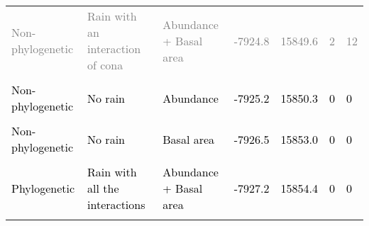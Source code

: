 \documentclass[
  12pt,
  letterpaper,
  DIV=11,
  numbers=noendperiod]{scrartcl}
\begin{document}
\begin{table}[H]
{\begin{tabular}[t]{lllllll}
\textcolor{gray}{Non-phylogenetic} & \textcolor{gray}{Rain with an interaction of cona} & \textcolor{gray}{Abundance + Basal area} & \textcolor{gray}{-7924.8} & \textcolor{gray}{15849.6} & \textcolor{gray}{2} & \textcolor{gray}{12}\\
\cellcolor{gray!6}{\textcolor{black}{Phylogenetic}} & \cellcolor{gray!6}{\textcolor{black}{No rain}} & \cellcolor{gray!6}{\textcolor{black}{Basal area}} & \cellcolor{gray!6}{\textcolor{black}{-7925.0}} & \cellcolor{gray!6}{\textcolor{black}{15849.9}} & \cellcolor{gray!6}{\textcolor{black}{0}} & \cellcolor{gray!6}{\textcolor{black}{1}}\\
\addlinespace
\textcolor{black}{Non-phylogenetic} & \textcolor{black}{No rain} & \textcolor{black}{Abundance} & \textcolor{black}{-7925.2} & \textcolor{black}{15850.3} & \textcolor{black}{0} & \textcolor{black}{0}\\
\cellcolor{gray!6}{\textcolor{black}{Non-phylogenetic}} & \cellcolor{gray!6}{\textcolor{black}{Rain without interactions}} & \cellcolor{gray!6}{\textcolor{black}{Abundance + Basal area}} & \cellcolor{gray!6}{\textcolor{black}{-7925.9}} & \cellcolor{gray!6}{\textcolor{black}{15851.8}} & \cellcolor{gray!6}{\textcolor{black}{0}} & \cellcolor{gray!6}{\textcolor{black}{3}}\\
\textcolor{black}{Non-phylogenetic} & \textcolor{black}{No rain} & \textcolor{black}{Basal area} & \textcolor{black}{-7926.5} & \textcolor{black}{15853.0} & \textcolor{black}{0} & \textcolor{black}{0}\\
\cellcolor{gray!6}{\textcolor{black}{Phylogenetic}} & \cellcolor{gray!6}{\textcolor{black}{Rain with an interaction of cons and cona}} & \cellcolor{gray!6}{\textcolor{black}{Abundance + Basal area}} & \cellcolor{gray!6}{\textcolor{black}{-7927.0}} & \cellcolor{gray!6}{\textcolor{black}{15854.0}} & \cellcolor{gray!6}{\textcolor{black}{0}} & \cellcolor{gray!6}{\textcolor{black}{0}}\\
\textcolor{black}{Phylogenetic} & \textcolor{black}{Rain with all the interactions} & \textcolor{black}{Abundance + Basal area} & \textcolor{black}{-7927.2} & \textcolor{black}{15854.4} & \textcolor{black}{0} & \textcolor{black}{0}\\
\addlinespace
\cellcolor{gray!6}{\textcolor{black}{Non-phylogenetic}} & \cellcolor{gray!6}{\textcolor{black}{Rain with an interaction of cons and cona}} & \cellcolor{gray!6}{\textcolor{black}{Abundance + Basal area}} & \cellcolor{gray!6}{\textcolor{black}{-7927.2}} & \cellcolor{gray!6}{\textcolor{black}{15854.5}} & \cellcolor{gray!6}{\textcolor{black}{0}} & \cellcolor{gray!6}{\textcolor{black}{2}}\\

\end{tabular}}
\end{table}
\end{document}
